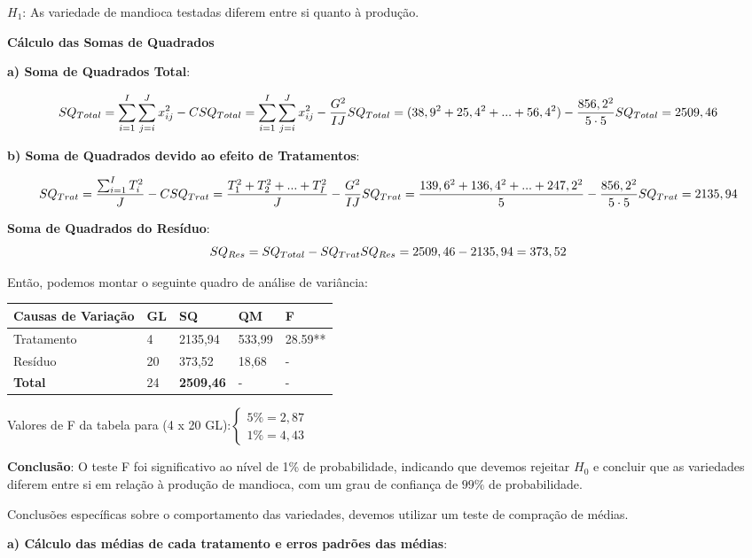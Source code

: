 \documentclass[
]{book}
\begin{document}
\(H_1\): As variedade de mandioca testadas diferem entre si quanto à produção.

\textbf{Cálculo das Somas de Quadrados}

\textbf{a) Soma de Quadrados Total}:

\[
SQ_{Total} = \sum_{i=1}^I\sum_{j=i}^Jx_{ij}^2 - C \\
SQ_{Total} = \sum_{i=1}^I\sum_{j=i}^Jx_{ij}^2 - \frac{G^2}{IJ} \\
SQ_{Total} = (38,9^2+25,4^2+...+56,4^2) - \frac{856,2^2}{5\cdot5}\\
SQ_{Total} = 2509,46
\]

\textbf{b) Soma de Quadrados devido ao efeito de Tratamentos}:

\[
SQ_{Trat} = \frac{\sum_{i=1}^IT_i^2}{J} - C \\
SQ_{Trat} = \frac{T_1^2+T_2^2+...+T_I^2}{J} - \frac{G^2}{IJ}\\
SQ_{Trat} = \frac{139,6^2+136,4^2+...+247,2^2}{5} - \frac{856,2^2}{5\cdot5}\\ 
SQ_{Trat}= 2135,94
\]

\textbf{Soma de Quadrados do Resíduo}:
\[
SQ_{Res} = SQ_{Total} - SQ_{Trat} \\
SQ_{Res} = 2509,46 - 2135,94 = 373,52
\]

Então, podemos montar o seguinte quadro de análise de variância:

\begin{longtable}[]{@{}lllll@{}}
\toprule
Causas de Variação & GL & SQ & QM & F\tabularnewline
\midrule
\endhead
Tratamento & 4 & 2135,94 & 533,99 & 28.59**\tabularnewline
Resíduo & 20 & 373,52 & 18,68 & -\tabularnewline
\textbf{Total} & 24 & \textbf{2509,46} & - & -\tabularnewline
\bottomrule
\end{longtable}

Valores de F da tabela para (4 x 20 GL):\(\begin{cases} 5\%=2,87 \\ 1\%=4,43 \end{cases}\)

\textbf{Conclusão}: O teste F foi significativo ao nível de 1\% de probabilidade, indicando que devemos rejeitar \(H_0\) e concluir que as variedades diferem entre si em relação à produção de mandioca, com um grau de confiança de \(99\%\) de probabilidade.

Conclusões específicas sobre o comportamento das variedades, devemos utilizar um teste de compração de médias.

\textbf{a) Cálculo das médias de cada tratamento e erros padrões das médias}:
\end{document}
